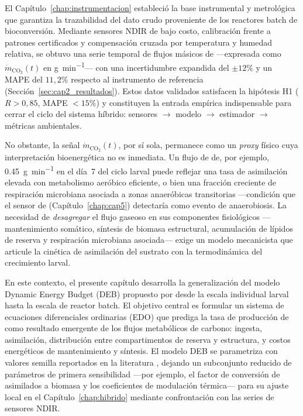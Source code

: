 
El Capítulo~\ref{chap:instrumentacion} estableció la base instrumental y metrológica que garantiza la trazabilidad del dato crudo proveniente de los reactores batch de bioconversión. Mediante sensores NDIR de bajo costo, calibración frente a patrones certificados y compensación cruzada por temperatura y humedad relativa, se obtuvo una serie temporal de flujos másicos de  ---expresada como $\dot{m}_{\mathrm{CO_2}}(t)$ en \si{\gram\per\minute}--- con una incertidumbre expandida del $\pm 12\%$ y un MAPE del $11{,}2\%$ respecto al instrumento de referencia (Sección~\ref{sec:cap2_resultados}). Estos datos validados satisfacen la hipótesis H1 ($R > 0{,}85$, MAPE $< 15\%$) y constituyen la entrada empírica indispensable para cerrar el ciclo del sistema híbrido: sensores $\rightarrow$ modelo $\rightarrow$ estimador $\rightarrow$ métricas ambientales.

No obstante, la señal $\dot{m}_{\mathrm{CO_2}}(t)$, por sí sola, permanece como un \emph{proxy} físico cuya interpretación bioenergética no es inmediata. Un flujo de  de, por ejemplo, \num{0.45}~\si{\gram\per\minute} en el día~7 del ciclo larval puede reflejar una tasa de asimilación elevada con metabolismo aeróbico eficiente, o bien una fracción creciente de respiración microbiana asociada a zonas anaeróbicas transitorias ---condición que el sensor de  (Capítulo~\ref{chap:cap5}) detectaría como evento de anaerobiosis. La necesidad de \emph{desagregar} el flujo gaseoso en sus componentes fisiológicos ---mantenimiento somático, síntesis de biomasa estructural, acumulación de lípidos de reserva y respiración microbiana asociada--- exige un modelo mecanicista que articule la cinética de asimilación del sustrato con la termodinámica del crecimiento larval.

En este contexto, el presente capítulo desarrolla la generalización del modelo Dynamic Energy Budget (DEB) propuesto por \textcite{eriksenDynamicModellingFeed2022} desde la escala individual larval hasta la escala de reactor batch. El objetivo central es formular un sistema de ecuaciones diferenciales ordinarias (EDO) que prediga la tasa de producción de  como resultado emergente de los flujos metabólicos de carbono: ingesta, asimilación, distribución entre compartimentos de reserva y estructura, y costos energéticos de mantenimiento y síntesis. El modelo DEB se parametriza con valores semilla reportados en la literatura \parencite{eriksenDynamicModellingFeed2022,padmanabhaComprehensiveDynamicGrowth2020}, dejando un subconjunto reducido de parámetros de primera sensibilidad ---por ejemplo, el factor de conversión de asimilados a biomasa y los coeficientes de modulación térmica--- para su ajuste local en el Capítulo~\ref{chap:hibrido} mediante confrontación con las series de sensores NDIR.

